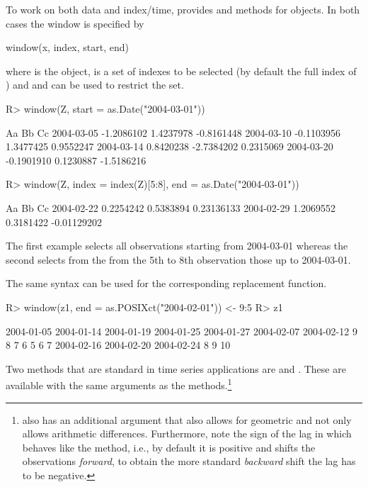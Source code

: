 \documentclass{Z}
\begin{document}
To work on both data and index/time,  provides
 and  methods for  objects.
In both cases the window is specified by
\begin{Scode}
window(x, index, start, end)
\end{Scode}
where  is the  object,  is a set
of indexes to be selected (by default the full index of )
and  and  can be used to restrict the 
 set. 
\begin{Schunk}
\begin{Sinput}
R> window(Z, start = as.Date("2004-03-01"))
\end{Sinput}
\begin{Soutput}
                   Aa         Bb         Cc
2004-03-05 -1.2086102  1.4237978 -0.8161448
2004-03-10 -0.1103956  1.3477425  0.9552247
2004-03-14  0.8420238 -2.7384202  0.2315069
2004-03-20 -0.1901910  0.1230887 -1.5186216
\end{Soutput}
\begin{Sinput}
R> window(Z, index = index(Z)[5:8], end = as.Date("2004-03-01"))
\end{Sinput}
\begin{Soutput}
                  Aa        Bb          Cc
2004-02-22 0.2254242 0.5383894  0.23136133
2004-02-29 1.2069552 0.3181422 -0.01129202
\end{Soutput}
\end{Schunk}

The first example selects all observations starting from 2004-03-01
whereas the second selects from the from the 5th to 8th observation
those up to 2004-03-01.

The same syntax can be used for the corresponding replacement function.
\begin{Schunk}
\begin{Sinput}
R> window(z1, end = as.POSIXct("2004-02-01")) <- 9:5
R> z1
\end{Sinput}
\begin{Soutput}
2004-01-05 2004-01-14 2004-01-19 2004-01-25 2004-01-27 2004-02-07 2004-02-12 
         9          8          7          6          5          6          7 
2004-02-16 2004-02-20 2004-02-24 
         8          9         10 
\end{Soutput}
\end{Schunk}

Two methods that are standard in time series applications
are  and . These are available with the same
arguments as the  methods.\footnote{ also
has an additional argument that also allows for geometric and
not only allows arithmetic differences. Furthermore, note the sign
of the lag in  which behaves like the  method, i.e.,
by default it is positive and shifts the 
observations \emph{forward}, to obtain the more standard \emph{backward}
shift the lag has to be negative.}
\end{document}
